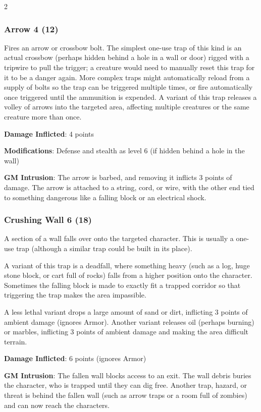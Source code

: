 \begin{multicols}{2}
\subsubsection{Arrow 4 (12)}

Fires an arrow or crossbow bolt. The simplest one-use trap of this kind is an actual crossbow (perhaps hidden behind a hole in a wall or door) rigged with a tripwire to pull the trigger; a creature would need to manually reset this trap for it to be a danger again. More complex traps might automatically reload from a supply of bolts so the trap can be triggered multiple times, or fire automatically once triggered until the ammunition is expended. A variant of this trap releases a volley of arrows into the targeted area, affecting multiple creatures or the same creature more than once. 

\textbf{Damage Inflicted}: 4 points 

\textbf{Modifications}: Defense and stealth as level 6 (if hidden behind a hole in the wall) 

\textbf{GM Intrusion}: The arrow is barbed, and removing it inflicts 3 points of damage. The arrow is attached to a string, cord, or wire, with the other end tied to something dangerous like a falling block or an electrical shock.

\subsubsection{Crushing Wall 6 (18)}

A section of a wall falls over onto the targeted character. This is usually a one-use trap (although a similar trap could be built in its place). 

A variant of this trap is a deadfall, where something heavy (such as a log, huge stone block, or cart full of rocks) falls from a higher position onto the character. Sometimes the falling block is made to exactly fit a trapped corridor so that triggering the trap makes the area impassible.

A less lethal variant drops a large amount of sand or dirt, inflicting 3 points of ambient damage (ignores Armor). Another variant releases oil (perhaps burning) or marbles, inflicting 3 points of ambient damage and making the area difficult terrain.

\textbf{Damage Inflicted}: 6 points (ignores Armor) 

\textbf{GM Intrusion}: The fallen wall blocks access to an exit. The wall debris buries the character, who is trapped until they can dig free. Another trap, hazard, or threat is behind the fallen wall (such as arrow traps or a room full of zombies) and can now reach the characters.


\end{multicols}
